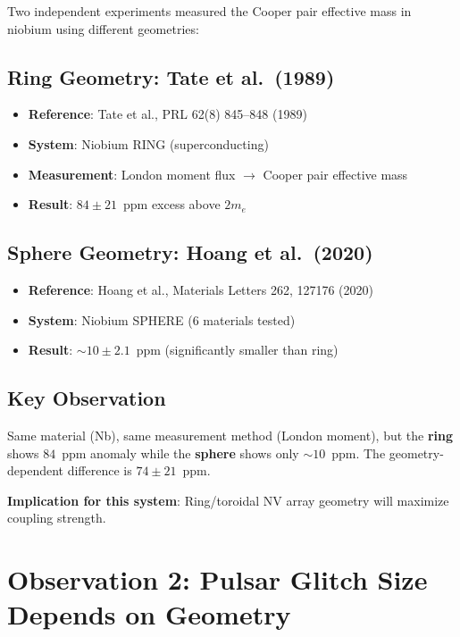 \documentclass[11pt,a4paper,openany]{book}
\begin{document}
Two independent experiments measured the Cooper pair effective mass in niobium using different geometries:

\subsection{Ring Geometry: Tate et al.\ (1989)}

\begin{itemize}[nosep]
  \item \textbf{Reference}: Tate et al., PRL 62(8) 845--848 (1989)
  \item \textbf{System}: Niobium RING (superconducting)
  \item \textbf{Measurement}: London moment flux $\to$ Cooper pair effective mass
  \item \textbf{Result}: $84 \pm 21$~ppm excess above $2m_e$
\end{itemize}

\subsection{Sphere Geometry: Hoang et al.\ (2020)}

\begin{itemize}[nosep]
  \item \textbf{Reference}: Hoang et al., Materials Letters 262, 127176 (2020)
  \item \textbf{System}: Niobium SPHERE (6 materials tested)
  \item \textbf{Result}: ${\sim}10 \pm 2.1$~ppm (significantly smaller than ring)
\end{itemize}

\subsection{Key Observation}

Same material (Nb), same measurement method (London moment), but the \textbf{ring} shows $84$~ppm anomaly while the \textbf{sphere} shows only ${\sim}10$~ppm. The geometry-dependent difference is $74 \pm 21$~ppm.

\noindent
\textbf{Implication for this system}: Ring/toroidal NV array geometry will maximize coupling strength.

\section{Observation 2: Pulsar Glitch Size Depends on Geometry}
\end{document}
